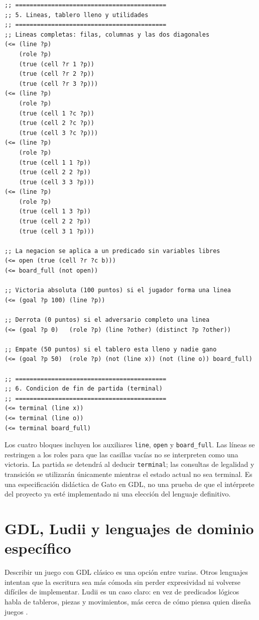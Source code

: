 \begin{lstlisting}[float=p,caption={Reglas de utilidad (goal) y condición de terminación en GDL.},label={lst:gdl_terminal_goal}]
;; ==========================================
;; 5. Lineas, tablero lleno y utilidades
;; ==========================================
;; Lineas completas: filas, columnas y las dos diagonales
(<= (line ?p)
    (role ?p)
    (true (cell ?r 1 ?p))
    (true (cell ?r 2 ?p))
    (true (cell ?r 3 ?p)))
(<= (line ?p)
    (role ?p)
    (true (cell 1 ?c ?p))
    (true (cell 2 ?c ?p))
    (true (cell 3 ?c ?p)))
(<= (line ?p)
    (role ?p)
    (true (cell 1 1 ?p))
    (true (cell 2 2 ?p))
    (true (cell 3 3 ?p)))
(<= (line ?p)
    (role ?p)
    (true (cell 1 3 ?p))
    (true (cell 2 2 ?p))
    (true (cell 3 1 ?p)))

;; La negacion se aplica a un predicado sin variables libres
(<= open (true (cell ?r ?c b)))
(<= board_full (not open))

;; Victoria absoluta (100 puntos) si el jugador forma una linea
(<= (goal ?p 100) (line ?p))

;; Derrota (0 puntos) si el adversario completo una linea
(<= (goal ?p 0)   (role ?p) (line ?other) (distinct ?p ?other))

;; Empate (50 puntos) si el tablero esta lleno y nadie gano
(<= (goal ?p 50)  (role ?p) (not (line x)) (not (line o)) board_full)

;; ==========================================
;; 6. Condicion de fin de partida (terminal)
;; ==========================================
(<= terminal (line x))
(<= terminal (line o))
(<= terminal board_full)
\end{lstlisting}

Los cuatro bloques incluyen los auxiliares \texttt{line}, \texttt{open} y \texttt{board\_full}. Las líneas se restringen a los roles para que las casillas vacías no se interpreten como una victoria. La partida se detendrá al deducir \texttt{terminal}; las consultas de legalidad y transición se utilizarán únicamente mientras el estado actual no sea terminal. Es una especificación didáctica de Gato en GDL, no una prueba de que el intérprete del proyecto ya esté implementado ni una elección del lenguaje definitivo.

\section{GDL, Ludii y lenguajes de dominio específico}

Describir un juego con GDL clásico es una opción entre varias. Otros lenguajes intentan que la escritura sea más cómoda sin perder expresividad ni volverse difíciles de implementar. Ludii es un caso claro: en vez de predicados lógicos habla de tableros, piezas y movimientos, más cerca de cómo piensa quien diseña juegos \cite{Soemers2024Ludii}.

